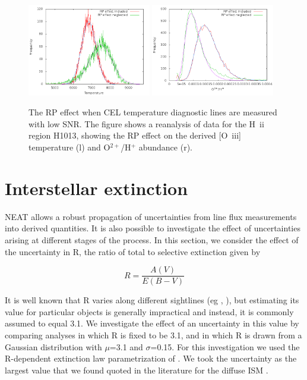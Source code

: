 \documentclass[useAMS,usenatbib]{mn2e}
\begin{document}
\begin{figure}
\includegraphics[width=0.48\textwidth]{figures/h1013_rp_temperature.png}
\includegraphics[width=0.48\textwidth]{figures/h1013_rp_abundance.png}
\caption{The RP effect when CEL temperature diagnostic lines are measured with low SNR.  The figure shows a reanalysis of data for the H~{\sc ii} region H1013, showing the RP effect on the derived [O~{\sc iii}] temperature (l) and O$^{2+}$/H$^+$ abundance (r).}
\label{h1013_RP_effect}
\end{figure}

\section{Interstellar extinction}
\label{extinction}

NEAT allows a robust propagation of uncertainties from line flux measurements into derived quantities.  It is also possible to investigate the effect of uncertainties arising at different stages of the process.  In this section, we consider the effect of the uncertainty in R, the ratio of total to selective extinction given by

\begin{equation}
R = \frac{A(V)}{E(B-V)}
\end{equation}

It is well known that R varies along different sightlines (eg \citet{2004ApJ...616..912V}, \citet{2005ApJ...623..897L}), but estimating its value for particular objects is generally impractical and instead, it is commonly assumed to equal 3.1.  We investigate the effect of an uncertainty in this value by comparing analyses in which R is fixed to be 3.1, and in which R is drawn from a Gaussian distribution with $\mu$=3.1 and $\sigma$=0.15.  For this investigation we used the R-dependent extinction law parametrization of \citet{1989ApJ...345..245C}.  We took the uncertainty as the largest value that we found quoted in the literature for the diffuse ISM \citep{2005ApJ...623..897L}.
\end{document}
